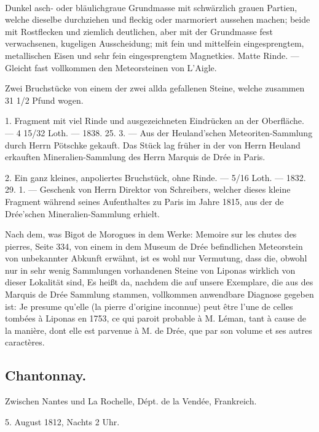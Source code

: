 \documentclass[a4paper, 11pt, oneside, polutonikogreek, german]{article}
\begin{document}
\paragraph{}
Dunkel asch- oder bläulichgraue Grundmasse mit schwärzlich grauen Partien, welche dieselbe durchziehen und fleckig oder marmoriert aussehen machen; beide mit Rostflecken und ziemlich deutlichen, aber mit der Grundmasse fest verwachsenen, kugeligen Ausscheidung; mit fein und mittelfein eingesprengtem, metallischen Eisen und sehr fein eingesprengtem Magnetkies. Matte Rinde. — Gleicht fast vollkommen den Meteorsteinen von L'Aigle.

Zwei Bruchstücke von einem der zwei allda gefallenen Steine, welche zusammen 31 1/2 Pfund wogen.

1. Fragment mit viel Rinde und ausgezeichneten Eindrücken an der Oberfläche. — 4 15/32 Loth. — 1838. 25. 3. — Aus der Heuland'schen Meteoriten-Sammlung durch Herrn Pötschke gekauft. Das Stück lag früher in der von Herrn Heuland erkauften Mineralien-Sammlung des Herrn Marquis de Drée in Paris.

2. Ein ganz kleines, anpoliertes Bruchstück, ohne Rinde. — 5/16 Loth. — 1832. 29. 1. — Geschenk von Herrn Direktor von Schreibers, welcher dieses kleine Fragment während seines Aufenthaltes zu Paris im Jahre 1815, aus der de Drée'schen Mineralien-Sammlung erhielt.

Nach dem, was Bigot de Morogues in dem Werke: Memoire sur les chutes des pierres, Seite 334, von einem in dem Museum de Drée befindlichen Meteorstein von unbekannter Abkunft erwähnt, ist es wohl nur Vermutung, dass die, obwohl nur in sehr wenig Sammlungen vorhandenen Steine von Liponas wirklich von dieser Lokalität sind, Es heißt da, nachdem die auf unsere Exemplare, die aus des Marquis de Drée Sammlung stammen, vollkommen anwendbare Diagnose gegeben ist: Je presume qu'elle (la pierre d'origine inconnue) peut être l'une de celles tombées à Liponas en 1753, ce qui paroit probable à M. Léman, tant à cause de la manière, dont elle est parvenue à M. de Drée, que par son volume et ses autres caractères.
\subsection{Chantonnay.}
\begin{center}
\small
Zwischen Nantes und La Rochelle, Dépt. de la Vendée, Frankreich.

5. August 1812, Nachts 2 Uhr.
\end{center}
\end{document}
